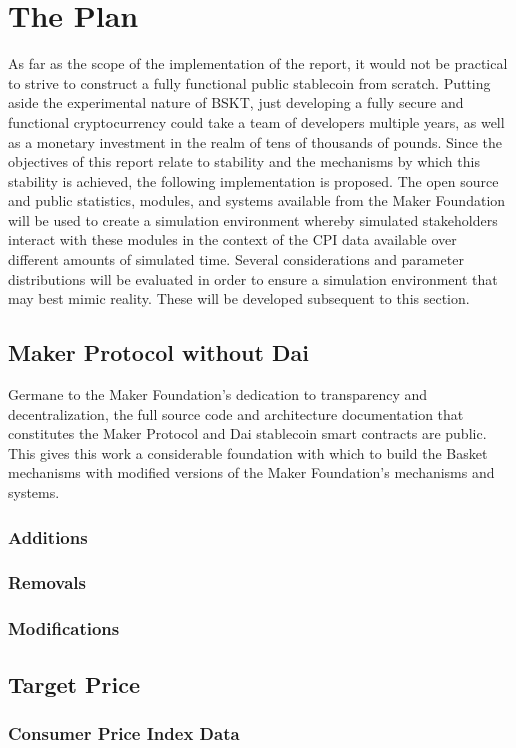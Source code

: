 \documentclass[bsc,frontabs,singlespacing,parskip,deptreport]{infthesis}
\begin{document}
    \section{The Plan}
    As far as the scope of the implementation of the report, it would not be practical to strive to construct a fully functional public stablecoin from scratch. Putting aside the experimental nature of BSKT, just developing a fully secure and functional cryptocurrency could take a team of developers multiple years, as well as a monetary investment in the realm of tens of thousands of pounds. Since the objectives of this report relate to stability and the mechanisms by which this stability is achieved, the following implementation is proposed. The open source and public statistics, modules, and systems available from the Maker Foundation will be used to create a simulation environment whereby simulated stakeholders interact with these modules in the context of the CPI data available over different amounts of simulated time. Several considerations and parameter distributions will be evaluated in order to ensure a simulation environment that may best mimic reality. These will be developed subsequent to this section.
    \subsection{Maker Protocol without Dai}
    Germane to the Maker Foundation's dedication to transparency and decentralization, the full source code and architecture documentation that constitutes the Maker Protocol and Dai stablecoin smart contracts are public. This gives this work a considerable foundation with which to build the Basket mechanisms with modified versions of the Maker Foundation's mechanisms and systems. 
    \subsubsection{Additions}
    \subsubsection{Removals}
    \subsubsection{Modifications}
    \subsection{Target Price}
    \subsubsection{Consumer Price Index Data}
\end{document}
